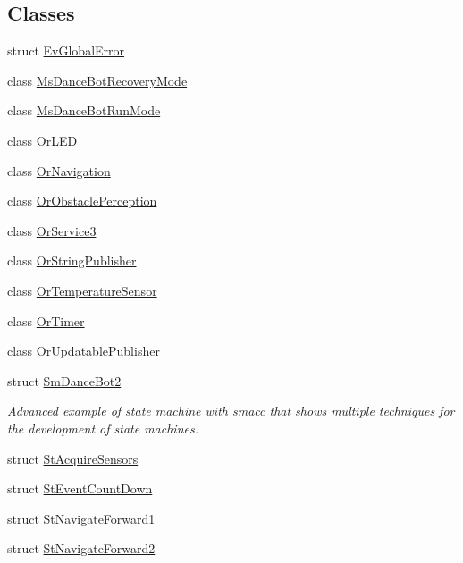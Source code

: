 \subsection*{Classes}
\begin{DoxyCompactItemize}
\item 
struct \hyperlink{structsm__dance__bot__2_1_1EvGlobalError}{Ev\+Global\+Error}
\item 
class \hyperlink{classsm__dance__bot__2_1_1MsDanceBotRecoveryMode}{Ms\+Dance\+Bot\+Recovery\+Mode}
\item 
class \hyperlink{classsm__dance__bot__2_1_1MsDanceBotRunMode}{Ms\+Dance\+Bot\+Run\+Mode}
\item 
class \hyperlink{classsm__dance__bot__2_1_1OrLED}{Or\+L\+ED}
\item 
class \hyperlink{classsm__dance__bot__2_1_1OrNavigation}{Or\+Navigation}
\item 
class \hyperlink{classsm__dance__bot__2_1_1OrObstaclePerception}{Or\+Obstacle\+Perception}
\item 
class \hyperlink{classsm__dance__bot__2_1_1OrService3}{Or\+Service3}
\item 
class \hyperlink{classsm__dance__bot__2_1_1OrStringPublisher}{Or\+String\+Publisher}
\item 
class \hyperlink{classsm__dance__bot__2_1_1OrTemperatureSensor}{Or\+Temperature\+Sensor}
\item 
class \hyperlink{classsm__dance__bot__2_1_1OrTimer}{Or\+Timer}
\item 
class \hyperlink{classsm__dance__bot__2_1_1OrUpdatablePublisher}{Or\+Updatable\+Publisher}
\item 
struct \hyperlink{structsm__dance__bot__2_1_1SmDanceBot2}{Sm\+Dance\+Bot2}
\begin{DoxyCompactList}\small\item\em Advanced example of state machine with smacc that shows multiple techniques for the development of state machines. \end{DoxyCompactList}\item 
struct \hyperlink{structsm__dance__bot__2_1_1StAcquireSensors}{St\+Acquire\+Sensors}
\item 
struct \hyperlink{structsm__dance__bot__2_1_1StEventCountDown}{St\+Event\+Count\+Down}
\item 
struct \hyperlink{structsm__dance__bot__2_1_1StNavigateForward1}{St\+Navigate\+Forward1}
\item 
struct \hyperlink{structsm__dance__bot__2_1_1StNavigateForward2}{St\+Navigate\+Forward2}

\end{DoxyCompactItemize}
